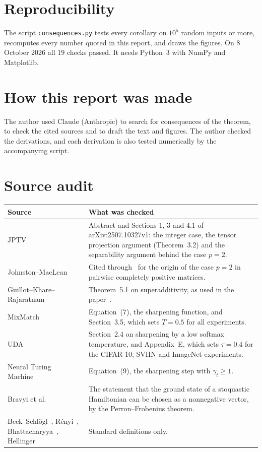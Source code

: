 \documentclass[11pt]{article}
\theoremstyle{remark}
\begin{document}
\section*{Reproducibility}
The script \texttt{consequences.py} tests every corollary on $10^5$ random inputs or more, recomputes every number quoted in this report, and draws the figures. On 8 October 2026 all $19$ checks passed. It needs Python~3 with NumPy and Matplotlib.

\section*{How this report was made}
The author used Claude (Anthropic) to search for consequences of the theorem, to check the cited sources and to draft the text and figures. The author checked the derivations, and each derivation is also tested numerically by the accompanying script.

\appendix
\section{Source audit}\label{app:audit}

\begin{center}
\small
\begin{tabularx}{\textwidth}{@{}p{3.6cm}X@{}}
\toprule
Source & What was checked \\
\midrule
JPTV~\cite{JPTV} & Abstract and Sections 1, 3 and 4.1 of arXiv:2507.10327v1: the integer case, the tensor projection argument (Theorem~3.2) and the separability argument behind the case $p=2$. \\
Johnston--MacLean~\cite{JM19} & Cited through~\cite{JPTV} for the origin of the case $p=2$ in pairwise completely positive matrices. \\
Guillot--Khare--Rajaratnam~\cite{GKR15} & Theorem~5.1 on superadditivity, as used in the paper~\cite{Paper}. \\
MixMatch~\cite{MixMatch} & Equation~(7), the sharpening function, and Section~3.5, which sets $T=0.5$ for all experiments. \\
UDA~\cite{UDA} & Section~2.4 on sharpening by a low softmax temperature, and Appendix~E, which sets $\tau=0.4$ for the CIFAR-10, SVHN and ImageNet experiments. \\
Neural Turing Machine~\cite{NTM} & Equation~(9), the sharpening step with $\gamma_t\ge1$. \\
Bravyi et al.~\cite{Stoq} & The statement that the ground state of a stoquastic Hamiltonian can be chosen as a nonnegative vector, by the Perron--Frobenius theorem. \\
Beck--Schlögl~\cite{BeckSchlogl}, Rényi~\cite{Renyi}, Bhattacharyya~\cite{Bhattacharyya}, Hellinger~\cite{Hellinger} & Standard definitions only. \\
\bottomrule
\end{tabularx}
\end{center}
\end{document}
